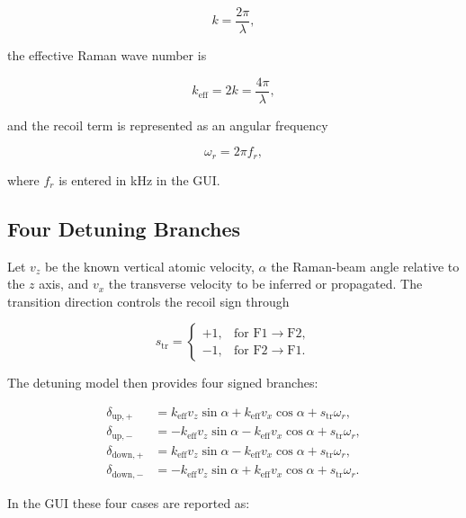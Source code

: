 \documentclass[11pt,a4paper]{article}
\begin{document}
\begin{equation}
k = \frac{2\pi}{\lambda},
\end{equation}

the effective Raman wave number is

\begin{equation}
k_{\mathrm{eff}} = 2k = \frac{4\pi}{\lambda},
\end{equation}

and the recoil term is represented as an angular frequency

\begin{equation}
\omega_r = 2\pi f_r,
\end{equation}

where $f_r$ is entered in kHz in the GUI.

\subsection{Four Detuning Branches}

Let $v_z$ be the known vertical atomic velocity, $\alpha$ the Raman-beam angle relative to the
$z$ axis, and $v_x$ the transverse velocity to be inferred or propagated. The transition direction
controls the recoil sign through

\begin{equation}
s_{\mathrm{tr}} =
\begin{cases}
+1, & \text{for } \mathrm{F1}\rightarrow\mathrm{F2}, \\
-1, & \text{for } \mathrm{F2}\rightarrow\mathrm{F1}.
\end{cases}
\end{equation}

The detuning model then provides four signed branches:

\begin{align}
\delta_{\mathrm{up},+} &= k_{\mathrm{eff}}v_z\sin\alpha + k_{\mathrm{eff}}v_x\cos\alpha + s_{\mathrm{tr}}\omega_r, \\
\delta_{\mathrm{up},-} &= -k_{\mathrm{eff}}v_z\sin\alpha - k_{\mathrm{eff}}v_x\cos\alpha + s_{\mathrm{tr}}\omega_r, \\
\delta_{\mathrm{down},+} &= k_{\mathrm{eff}}v_z\sin\alpha - k_{\mathrm{eff}}v_x\cos\alpha + s_{\mathrm{tr}}\omega_r, \\
\delta_{\mathrm{down},-} &= -k_{\mathrm{eff}}v_z\sin\alpha + k_{\mathrm{eff}}v_x\cos\alpha + s_{\mathrm{tr}}\omega_r.
\end{align}

In the GUI these four cases are reported as:
\end{document}
